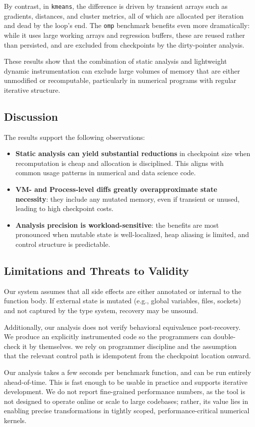 By contrast, in \texttt{kmeans}, the difference is driven by transient arrays such as gradients, distances, and cluster metrics, all of which are allocated per iteration and dead by the loop's end. The \texttt{omp} benchmark benefits even more dramatically: while it uses large working arrays and regression buffers, these are reused rather than persisted, and are excluded from checkpoints by the dirty-pointer analysis.

These results show that the combination of static analysis and lightweight dynamic instrumentation can exclude large volumes of memory that are either unmodified or recomputable, particularly in numerical programs with regular iterative structure.

\subsection{Discussion}

The results support the following observations:

\begin{itemize}
  \item \textbf{Static analysis can yield substantial reductions} in checkpoint size when recomputation is cheap and allocation is disciplined. This aligns with common usage patterns in numerical and data science code.
  \item \textbf{VM- and Process-level diffs greatly overapproximate state necessity}: they include any mutated memory, even if transient or unused, leading to high checkpoint costs.
  \item \textbf{Analysis precision is workload-sensitive}: the benefits are most pronounced when mutable state is well-localized, heap aliasing is limited, and control structure is predictable.
\end{itemize}

\subsection{Limitations and Threats to Validity}
\label{sec:threats}

Our system assumes that all side effects are either annotated or internal to the function body. If external state is mutated (e.g., global variables, files, sockets) and not captured by the type system, recovery may be unsound.

Additionally, our analysis does not verify behavioral equivalence post-recovery. We produce an explicitly instrumented code so the programmers can double-check it by themselves. we rely on programmer discipline and the assumption that the relevant control path is idempotent from the checkpoint location onward.

Our analysis takes a few seconds per benchmark function, and can be run entirely ahead-of-time. This is fast enough to be usable in practice and supports iterative development. We do not report fine-grained performance numbers, as the tool is not designed to operate online or scale to large codebases; rather, its value lies in enabling precise transformations in tightly scoped, performance-critical numerical kernels.
